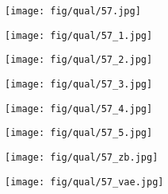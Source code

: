 \documentclass[10pt,twocolumn,letterpaper]{article}
\newcommand{\sz}{0.102}
\newcommand{\szl}{0.067}
\begin{document}
\begin{figure*}[t]
\center

\begin{subfigure}[c]{\sz\linewidth}
\texttt{[image: fig/qual/57.jpg]}
\end{subfigure}
\begin{subfigure}[c]{\sz\linewidth}
\texttt{[image: fig/qual/57\_1.jpg]}
\end{subfigure}
\begin{subfigure}[c]{\sz\linewidth}
\texttt{[image: fig/qual/57\_2.jpg]}
\end{subfigure}
\begin{subfigure}[c]{\sz\linewidth}
\texttt{[image: fig/qual/57\_3.jpg]}
\end{subfigure}
\begin{subfigure}[c]{\sz\linewidth}
\texttt{[image: fig/qual/57\_4.jpg]}
\end{subfigure}
\hspace{3pt}
\begin{subfigure}[c]{\sz\linewidth}
\texttt{[image: fig/qual/57\_5.jpg]}
\end{subfigure}
\begin{subfigure}[c]{\szl\linewidth}
\texttt{[image: fig/qual/57\_zb.jpg]}
\end{subfigure}
\hspace{3pt}
\begin{subfigure}[c]{\szl\linewidth}
\texttt{[image: fig/qual/57\_vae.jpg]}
\end{subfigure}



\end{figure*}
\end{document}
